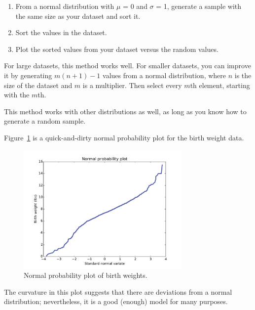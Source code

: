 \documentclass[12pt]{book}
\begin{document}
\begin{enumerate}

\item From a normal distribution with $\mu$ = 0 and $\sigma$ = 1,
generate a sample with the same size as your dataset and sort it.

\item Sort the values in the dataset.

\item Plot the sorted values from your dataset versus the random values.

\end{enumerate}

For large datasets, this method works well.
For smaller datasets, you can improve it by generating $m (n+1) - 1$
values from a normal distribution, where $n$ is the size of the
dataset and $m$ is a multiplier.  Then select every $m$th element,
starting with the $m$th.  


This method works with other distributions as well, as long as
you know how to generate a random sample.

Figure~\ref{nsfg_birthwgt_normal} is a quick-and-dirty normal
probability plot for the birth weight data.

\begin{figure}
\centerline{\includegraphics[height=2.5in]{figs/nsfg_birthwgt_normal.pdf}}
\caption{Normal probability plot of birth weights.}
\label{nsfg_birthwgt_normal}
\end{figure}

The curvature in this plot suggests that there are
deviations from a normal distribution; nevertheless, it is a
good (enough) model for many purposes.

\end{document}
